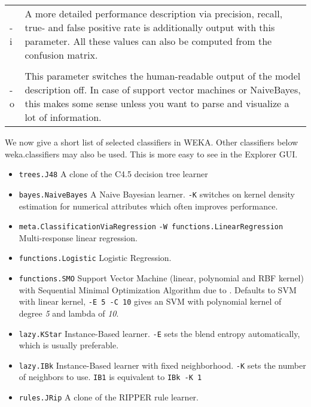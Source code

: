 \begin{tabular}{l l}
-i 
& 
\begin{minipage}{10cm}
A more detailed performance description via precision, recall, true- and false positive rate is additionally output with this parameter. All these values can also be computed from the confusion matrix. 
\end{minipage}
\\
\\

-o 
& 
\begin{minipage}{10cm}
This parameter switches the human-readable output of the model description off. In case of support vector machines or NaiveBayes, this makes some sense unless you want to parse and visualize a lot of information. 
\end{minipage}
\\
\end{tabular}
\vspace{0.5cm}

\noindent We now give a short list of selected classifiers in WEKA. Other classifiers below weka.classifiers may also be used. This is more easy to see in the Explorer GUI.

\begin{itemize}
	\item \texttt{trees.J48} A clone of the C4.5 decision tree learner
	\item \texttt{bayes.NaiveBayes} A Naive Bayesian learner. \texttt{-K} switches on kernel density estimation for numerical attributes which often improves performance.
	\item \texttt{meta.ClassificationViaRegression} \texttt{-W functions.LinearRegression} Multi-response linear regression.
	\item \texttt{functions.Logistic} Logistic Regression.
	\item \texttt{functions.SMO} Support Vector Machine (linear, polynomial and RBF kernel) with Sequential Minimal Optimization Algorithm due to \cite{platt98}. Defaults to SVM with linear kernel, \texttt{-E 5 -C 10} gives an SVM with polynomial kernel of degree \textit{5} and lambda of \textit{10}.
	\item \texttt{lazy.KStar} Instance-Based learner. \texttt{-E} sets the blend entropy automatically, which is usually preferable.
	\item \texttt{lazy.IBk} Instance-Based learner with fixed neighborhood. \texttt{-K} sets the number of neighbors to use. \texttt{IB1} is equivalent to \texttt{IBk -K 1}
	\item \texttt{rules.JRip} A clone of the RIPPER rule learner. 
\end{itemize}

